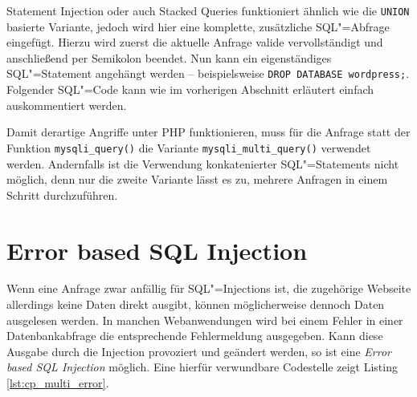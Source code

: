 {Statement Injection } oder auch Stacked Queries funktioniert ähnlich wie die \texttt{UNION} basierte Variante, jedoch wird hier eine komplette, zusätzliche SQL"=Abfrage eingefügt. Hierzu wird zuerst die aktuelle Anfrage valide vervollständigt und anschließend per Semikolon beendet. Nun kann ein eigenständiges SQL"=Statement angehängt werden -- beispielsweise \texttt{DROP DATABASE wordpress;}. Folgender SQL"=Code kann wie im vorherigen Abschnitt erläutert einfach auskommentiert werden.


Damit derartige Angriffe unter PHP funktionieren, muss für die Anfrage statt der Funktion \texttt{mysqli_query()} die Variante \texttt{mysqli_multi_query()} verwendet werden. Andernfalls ist die Verwendung konkatenierter SQL"=Statements nicht möglich, denn nur die zweite Variante lässt es zu, mehrere Anfragen in einem Schritt durchzuführen.


\section{Error based SQL Injection}

Wenn eine Anfrage zwar anfällig für SQL"=Injections ist, die zugehörige Webseite allerdings keine Daten direkt ausgibt, können möglicherweise dennoch Daten ausgelesen werden. In manchen Webanwendungen wird bei einem Fehler in einer Datenbankabfrage die entsprechende Fehlermeldung ausgegeben. Kann diese Ausgabe durch die Injection provoziert und geändert werden, so ist eine \emph{Error based SQL Injection} möglich. Eine hierfür verwundbare Codestelle zeigt Listing \ref{lst:cp_multi_error}.


\begin{listing}[ht!]
\begin{margincap}
\inputminted[startinline,obeytabs]{php}{imports/cp_multi_error.php}
\caption[Auszug aus einem verwundbaren Wordpress-Plugin]{Ein Auszug aus dem Wordpress"=Plugin \texttt{cp multi view calendar}\footnote{\url{https://github.com/wp-plugins/cp-multi-view-calendar}}. Die Variable \texttt{id} wird nicht überprüft und ermöglicht so SQL"=Injections. Im Fehlerfall wird die Meldung in Zeile 7 in eine lokale Variable geschrieben und später ausgegeben.}
\label{lst:cp_multi_error}
\end{margincap}
\end{listing}

